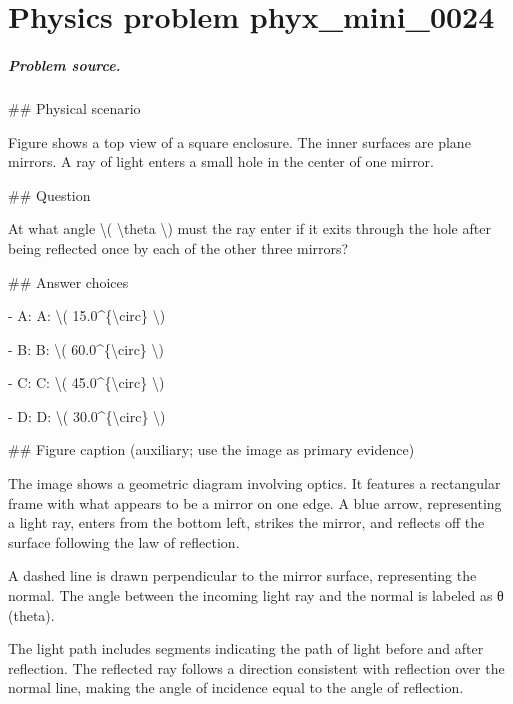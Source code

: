 
\chapter{Physics problem phyx\_mini\_0024}
\label{ch:PhyXMiniProblems_problem_phyx_mini_0024}

\paragraph{Problem source.}
\#\# Physical scenario

Figure shows a top view of a square enclosure. The inner surfaces are plane mirrors. A ray of light enters a small hole in the center of one mirror.

\#\# Question

At what angle \textbackslash{}( \textbackslash{}theta \textbackslash{}) must the ray enter if it exits through the hole after being reflected once by each of the other three mirrors?

\#\# Answer choices

- A: A: \textbackslash{}( 15.0\textasciicircum{}\{\textbackslash{}circ\} \textbackslash{})

- B: B: \textbackslash{}( 60.0\textasciicircum{}\{\textbackslash{}circ\} \textbackslash{})

- C: C: \textbackslash{}( 45.0\textasciicircum{}\{\textbackslash{}circ\} \textbackslash{})

- D: D: \textbackslash{}( 30.0\textasciicircum{}\{\textbackslash{}circ\} \textbackslash{})

\#\# Figure caption (auxiliary; use the image as primary evidence)

The image shows a geometric diagram involving optics. It features a rectangular frame with what appears to be a mirror on one edge. A blue arrow, representing a light ray, enters from the bottom left, strikes the mirror, and reflects off the surface following the law of reflection.

A dashed line is drawn perpendicular to the mirror surface, representing the normal. The angle between the incoming light ray and the normal is labeled as θ (theta).

The light path includes segments indicating the path of light before and after reflection. The reflected ray follows a direction consistent with reflection over the normal line, making the angle of incidence equal to the angle of reflection.

